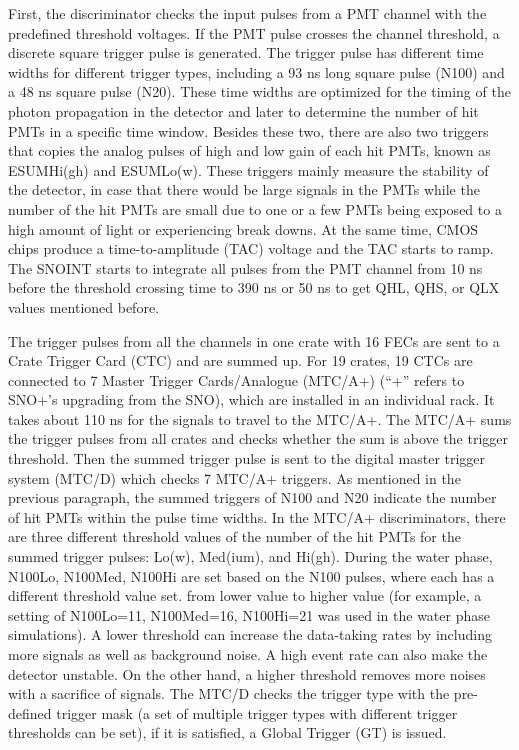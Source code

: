 First, the discriminator checks the input pulses from a PMT channel with the predefined threshold voltages. If the PMT pulse crosses the channel threshold, a discrete square trigger pulse is generated. The trigger pulse has different time widths for different trigger types, including a 93 ns long square pulse (N100) and a 48 ns square pulse (N20)\cite{joshTrigger}. These time widths are optimized for the timing of the photon propagation in the detector and later to determine the number of hit PMTs in a specific time window. Besides these two, there are also two triggers that copies the analog pulses of high and low gain of each hit PMTs, known as ESUMHi(gh) and ESUMLo(w). These triggers mainly measure the stability of the detector, in case that there would be large signals in the PMTs while the number of the hit PMTs are small due to one or a few PMTs being exposed to a high amount of light or experiencing break downs\cite{operator}. At the same time, CMOS chips produce a time-to-amplitude (TAC) voltage and the TAC starts to ramp. The SNOINT starts to integrate all pulses from the PMT channel from 10 ns before the threshold crossing time to 390 ns or 50 ns to get QHL, QHS, or QLX values mentioned before\cite{boger2000sudbury,stringer2019sensitivity}. 

The trigger pulses from all the channels in one crate with 16 FECs are sent to a Crate Trigger Card (CTC) and are summed up. For 19 crates, 19 CTCs are connected to 7 Master Trigger Cards/Analogue (MTC/A+) (``+'' refers to SNO+'s upgrading from the SNO), which are installed in an individual rack. It takes about 110 ns for the signals to travel to the MTC/A+. The MTC/A+ sums the trigger pulses from all crates and checks whether the sum is above the trigger threshold. Then the summed trigger pulse is sent to the digital master trigger system (MTC/D) which checks 7 MTC/A+ triggers. As mentioned in the previous paragraph, the summed triggers of N100 and N20 indicate the number of hit PMTs within the pulse time widths. In the MTC/A+ discriminators, there are three different threshold values of the number of the hit PMTs for the summed trigger pulses: Lo(w), Med(ium), and Hi(gh). During the water phase, N100Lo, N100Med, N100Hi are set based on the N100 pulses, where each has a different threshold value set. from lower value to higher value (for example, a setting of N100Lo=11, N100Med=16, N100Hi=21 was used in the water phase simulations). A lower threshold can increase the data-taking rates by including more signals as well as background noise. A high event rate can also make the detector unstable. On the other hand, a higher threshold removes more noises with a sacrifice of signals. The MTC/D checks the trigger type with the pre-defined trigger mask (a set of multiple trigger types with different trigger thresholds can be set), if it is satisfied, a Global Trigger (GT) is issued\cite{snop_nim,stringer2019sensitivity,rattime}. 

